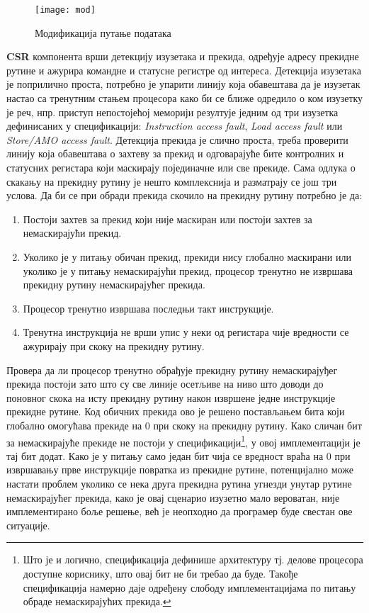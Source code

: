 \begin{wrapfigure}{l}{0.4\textwidth}
	\centering
	\texttt{[image: mod]}
	\caption{Модификација путање података}
	\label{fig:mod}
\end{wrapfigure}

\textbf{CSR} компонента врши детекцију изузетака и прекида, одређује адресу прекидне рутине и ажурира командне и статусне регистре од интереса.
Детекција изузетака је поприлично проста, потребно је упарити линију која обавештава да је изузетак настао са тренутним стањем процесора како би се ближе одредило о ком изузетку је реч, нпр. приступ непостојећој меморији резултује једним од три изузетка дефинисаних у спецификацији\cite{priv_spec}: \textit{Instruction access fault}, \textit{Load access fault} или \textit{Store/AMO access fault}. Детекција прекида је слично проста, треба проверити линију која обавештава о захтеву за прекид и одговарајуће бите контролних и статусних регистара који маскирају појединачне или све прекиде. Сама одлука о скакању на прекидну рутину је нешто комплекснија и разматрају се још три услова. Да би се при обради прекида скочило на прекидну рутину потребно је да:
\begin{enumerate}
	\item Постоји захтев за прекид који није маскиран или постоји захтев за немаскирајући прекид.
	\item Уколико је у питању обичан прекид, прекиди нису глобално маскирани или уколико је у питању немаскирајући прекид, процесор тренутно не извршава прекидну рутину немаскирајућег прекида.
	\item Процесор тренутно извршава последњи такт инструкције.
	\item Тренутна инструкција не врши упис у неки од регистара чије вредности се ажурирају при скоку на прекидну рутину.
\end{enumerate}

Провера да ли процесор тренутно обрађује прекидну рутину немаскирајуђег прекида постоји зато што су све линије осетљиве на ниво што доводи до поновног скока на исту прекидну рутину након извршене једне инструкције прекидне рутине. Код обичних прекида ово је решено постављањем бита који глобално омогућава прекиде на 0 при скоку на прекидну рутину. Како сличан бит за немаскирајуће прекиде не постоји у спецификацији\footnote{Што је и логично, спецификација дефинише архитектуру тј. делове процесора доступне кориснику, што овај бит не би требао да буде. Такође спецификација намерно даје одређену слободу имплементацијама по питању обраде немаскирајућих прекида.}, у овој имплементацији је тај бит додат. Како је у питању само један бит чија се вредност враћа на 0 при извршавању прве инструкције повратка из прекидне рутине, потенцијално може настати проблем уколико се нека друга прекидна рутина угнезди унутар рутине немаскирајућег прекида, како је овај сценарио изузетно мало вероватан, није имплементирано боље решење, већ је неопходно да програмер буде свестан ове ситуације.

